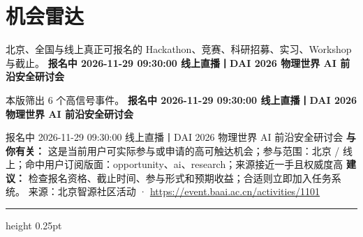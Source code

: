 \documentclass[10.5pt]{ctexart}
\begin{document}
\section*{机会雷达}
{\color{ormuted} 北京、全国与线上真正可报名的 Hackathon、竞赛、科研招募、实习、Workshop 与截止。}
\vspace{2mm}
{\LARGE\bfseries 报名中 2026-11-29 09:30:00 线上直播丨DAI 2026 物理世界 AI 前沿安全研讨会}\par
\vspace{1mm}
{\color{ormuted} 本版筛出 6 个高信号事件。}
\vspace{3mm}
{\Large\bfseries 报名中 2026-11-29 09:30:00 线上直播丨DAI 2026 物理世界 AI 前沿安全研讨会}\par
报名中 2026-11-29 09:30:00 线上直播丨DAI 2026 物理世界 AI 前沿安全研讨会
\textbf{与你有关：} 这是当前用户可实际参与或申请的高可触达机会；参与范围：北京 / 线上；命中用户订阅版面：opportunity、ai、research；来源接近一手且权威度高
\textbf{建议：} 检查报名资格、截止时间、参与形式和预期收益；合适则立即加入任务系统。
{\footnotesize\color{ormuted} 来源：北京智源社区活动 · \url{https://event.baai.ac.cn/activities/1101}}
\vspace{4mm}
\hrule height 0.25pt
\vspace{3mm}
\end{document}
